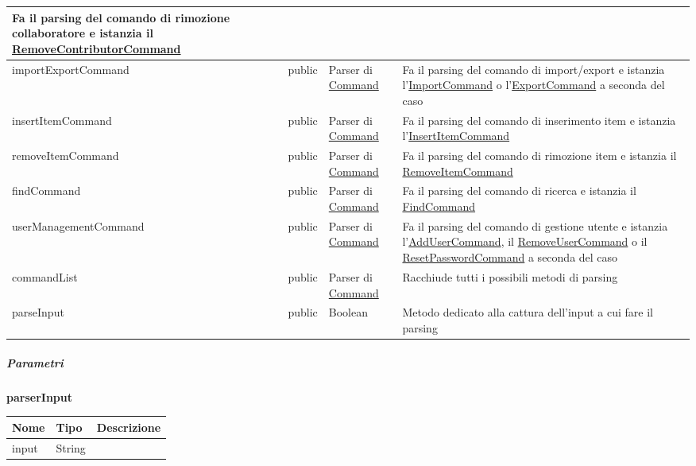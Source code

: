 \documentclass{scalatekids-article}
\begin{document}
\begin{tabular}{| p{5.5cm} | p{1.5cm} | p{2cm} | p{7.5cm} |}
                                                                                                          Fa il parsing del comando di rimozione collaboratore e istanzia il \hyperref[sec:actorbase::cli::models::RemoveContributorCommand]{RemoveContributorCommand}\\
  \hline
  importExportCommand & public & Parser di \hyperref[sec:actorbase::cli::models::Command]{Command} & Fa il parsing del comando di import/export e istanzia l'\hyperref[sec:actorbase::cli::models::ImportCommand]{ImportCommand} o l'\hyperref[sec:actorbase::cli::models::ExportCommand]{ExportCommand} a seconda del caso\\
  \hline
  insertItemCommand & public & Parser di \hyperref[sec:actorbase::cli::models::Command]{Command} & Fa il parsing del comando di inserimento item e istanzia l'\hyperref[sec:actorbase::cli::models::InsertItemCommand]{InsertItemCommand}\\
  \hline
  removeItemCommand & public & Parser di \hyperref[sec:actorbase::cli::models::Command]{Command} &
                                                                                                   Fa il parsing del comando di rimozione item e istanzia il \hyperref[sec:actorbase::cli::models::RemoveItemCommand]{RemoveItemCommand}\\
  \hline
  findCommand & public & Parser di \hyperref[sec:actorbase::cli::models::Command]{Command} & Fa il parsing del comando di ricerca e istanzia il \hyperref[sec:actorbase::cli::models::FindCommand]{FindCommand}\\
  \hline
  userManagementCommand & public & Parser di \hyperref[sec:actorbase::cli::models::Command]{Command} & Fa il parsing del comando di gestione utente e istanzia l'\hyperref[sec:actorbase::cli::models::AddUserCommand]{AddUserCommand}, il \hyperref[sec:actorbase::cli::models::RemoveUserCommand]{RemoveUserCommand} o il \hyperref[sec:actorbase::cli::models::ResetPasswordCommand]{ResetPasswordCommand} a seconda del caso\\
  \hline
  commandList & public & Parser di \hyperref[sec:actorbase::cli::models::Command]{Command} & Racchiude tutti i possibili metodi di parsing\\
  \hline
  parseInput & public & Boolean & Metodo dedicato alla cattura dell'input a cui fare il parsing\\
  \hline
\end{tabular}

\subparagraph{Parametri}

\begin{center}
  \textbf{parserInput}
\end{center}
\begin{tabular}{| p{3cm} | p{3.5cm} | p{8.5cm} |}
  \hline
  Nome & Tipo & Descrizione\\
  \hline
  input & String & \\
  \hline
\end{tabular}
\end{document}
